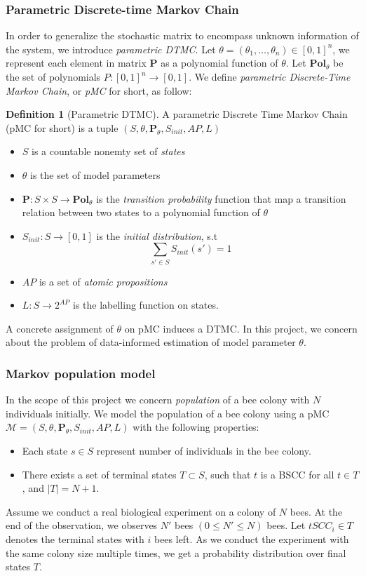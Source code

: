 \documentclass[12pt]{article}
\theoremstyle{definition}
\newtheorem{definition}{Definition}[section]
\begin{document}
\subsubsection{Parametric Discrete-time Markov Chain}
In order to generalize the stochastic matrix to encompass unknown information of
the system, we introduce \textit{parametric DTMC}. Let $\theta =
(\theta_1,\ldots,\theta_n) \in [0,1]^n$, we represent each element in matrix
$\mathbf{P}$ as a polynomial function of $\theta$. Let $\mathbf{Pol}_\theta$ be the
set of polynomials $P: [0,1]^n \rightarrow [0,1]$. We define
\textit{parametric Discrete-Time Markov Chain}, or \textit{pMC} for short, as
follow:

\begin{definition}[Parametric DTMC]
  A parametric Discrete Time Markov Chain (pMC for short) is a tuple $(S,\theta,
  \mathbf{P}_\theta, S_{init}, AP, L)$
  \begin{itemize}
  \item $S$ is a countable nonemty set of \textit{states}
  \item $\theta$ is the set of model parameters
  \item $\mathbf{P}:S \times S \rightarrow \mathbf{Pol}_\theta$ is the \textit{transition probability}
    function that map a transition relation between two states to a polynomial
    function of $\theta$
  \item $S_{init}: S \rightarrow [0,1]$ is the \textit{initial distribution},
    s.t  $$\sum_{s'\in S}S_{init}(s') = 1$$
  \item $AP$ is a set of \textit{atomic propositions}
  \item $L: S \rightarrow 2^{AP}$ is the labelling function on states.
  \end{itemize}
\end{definition}
A concrete assignment of $\theta$ on pMC induces a DTMC. In this project, we
concern about the problem of data-informed estimation of model parameter $\theta$.

\subsubsection{Markov population model}
In the scope of this project we concern \textit{population} of a bee colony with
$N$ individuals initially.
We model the population of a bee colony using a pMC $\mathcal{M}=(S,\theta,
\mathbf{P}_\theta, S_{init}, AP, L)$ with the following properties:
\begin{itemize}
\item Each state $s\in S$ represent number of individuals in the bee colony.
\item There exists a set of terminal states $T\subset S$, such that $t$  is
  a BSCC for all $t\in T$, and $|T|=N+1$.
\end{itemize}
Assume we conduct a real biological experiment on a colony of $N$ bees. At the
end of the observation, we observes $N'$ bees $(0\leq N' \leq N)$ bees. Let
$tSCC_i\in T$ denotes the terminal states with $i$ bees left. As we conduct the
experiment with the same colony size multiple times, we get a probability
distribution over final states $T$.\\
\end{document}

